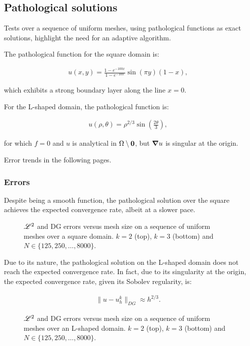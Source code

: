 \newpage
\subsection{Pathological solutions}

Tests over a sequence of uniform meshes, using pathological functions as exact solutions, highlight the need for an adaptive algorithm.

\cite{Antonietti2013} The pathological function for the square domain is:

\begin{gather} \label{pathological_square}
    u(x, y) = \frac{1 - e^{-100x}}{1 - e^{-100}} \sin(\pi y) (1 - x),
\end{gather}

which exhibits a strong boundary layer along the line $x = 0$.

For the L-shaped domain, the pathological function is:

\begin{gather} \label{pathological_lshape}
    u(\rho, \theta) = \rho^{2 / 3} \sin\left(\frac{2 \theta}{3}\right),
\end{gather}

for which $f = 0$ and $u$ is analytical in $\Omega \setminus \bm{0}$, but $\bm{\nabla}{u}$ is singular at the origin.

Error trends in the following pages.

\newpage
\subsubsection{Errors}

Despite being a smooth function, the pathological solution over the square achieves the expected convergence rate, albeit at a slower pace.

\begin{figure}[!ht]
    
    
    \caption{$\mathscr{L}^2$ and DG errors versus mesh size on a sequence of uniform meshes over a square domain. $k = 2$ (top), $k = 3$ (bottom) and $N \in \{125, 250, \dots, 8000\}$.}
\end{figure}

\newpage

Due to its nature, the pathological solution on the L-shaped domain does not reach the expected convergence rate. In fact, due to its singularity at the origin, the expected convergence rate, given its Sobolev regularity, is:

\begin{gather}
    \lVert u - u^k_h \rVert_{DG} \approx h^{2/3}.
\end{gather}

\begin{figure}[!ht]
    
    
    \caption{$\mathscr{L}^2$ and DG errors versus mesh size on a sequence of uniform meshes over an L-shaped domain. $k = 2$ (top), $k = 3$ (bottom) and $N \in \{125, 250, \dots, 8000\}$.}
\end{figure}